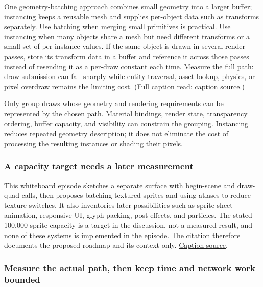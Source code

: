 One geometry-batching approach combines small geometry into a larger buffer; instancing keeps a reusable mesh and supplies per-object data such as transforms separately. Use batching when merging small primitives is practical. Use instancing when many objects share a mesh but need different transforms or a small set of per-instance values. If the same object is drawn in several render passes, store its transform data in a buffer and reference it across those passes instead of resending it as a per-draw constant each time. Measure the full path: draw submission can fall sharply while entity traversal, asset lookup, physics, or pixel overdraw remains the limiting cost. (Full caption read: \href{https://www.youtube.com/watch?v=81uFrHwhQg4}{caption source}.)

Only group draws whose geometry and rendering requirements can be represented by the chosen path. Material bindings, render state, transparency ordering, buffer capacity, and visibility can constrain the grouping. Instancing reduces repeated geometry description; it does not eliminate the cost of processing the resulting instances or shading their pixels.

\subsubsection{A capacity target needs a later measurement}\label{06-engine-ii-ch026-a-capacity-target-needs-a-later-measurement}

\hypertarget{06-engine-ii-ch026-a-capacity-target-needs-a-later-measurement}{}

This whiteboard episode sketches a separate  surface with begin-scene and draw-quad calls, then proposes batching textured sprites and using atlases to reduce texture switches. It also inventories later possibilities such as sprite-sheet animation, responsive UI, glyph packing, post effects, and particles. The stated 100,000-sprite capacity is a target in the discussion, not a measured result, and none of these systems is implemented in the episode. The citation therefore documents the proposed roadmap and its context only. \href{https://www.youtube.com/watch?v=ULO8JhM9FsQ}{Caption source}.

\subsubsection{Measure the actual path, then keep time and network work bounded}\label{06-engine-ii-ch026-measure-the-actual-path-then-keep-time-and-network-work-bounded}

